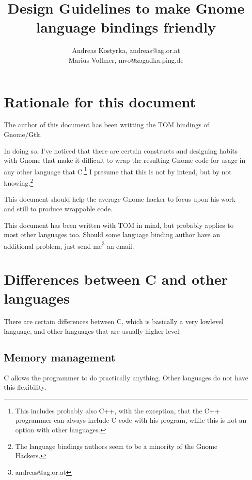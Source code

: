 \documentclass{article}
\begin{document}
\title{Design Guidelines to make Gnome language bindings friendly}
\author{Andreas Kostyrka, andreas@ag.or.at\\
        Marius Vollmer, mvo@zagadka.ping.de}
\maketitle
\tableofcontents
\section{Rationale for this document}
The author of this document has been writting the TOM bindings of
Gnome/Gtk.

In doing so, I've noticed that there are certain constructs and
designing habits with Gnome that make it difficult to wrap the
resulting Gnome code for usage in any other language that
C.\footnote{This includes probably also C++, with the exception, that
the C++ programmer can always include C code with his program, while
this is not an option with other languages.}
I presume that this is not by intend, but by not knowing.\footnote{The
language bindings authors seem to be a minority of the Gnome Hackers.}

This document should help the average Gnome hacker to focus upon his
work and still to produce wrappable code.

This document has been written with TOM in mind, but probably applies
to most other languages too. Should some language binding author have
an additional problem, just send me\footnote{andreas@ag.or.at} an
email.

\section{Differences between C and other languages}

There are certain differences between C, which is basically a very
lowlevel language, and other languages that are usually higher level.

\subsection{Memory management}

C allows the programmer to do practically anything. Other languages do
not have this flexibility.
\end{document}
